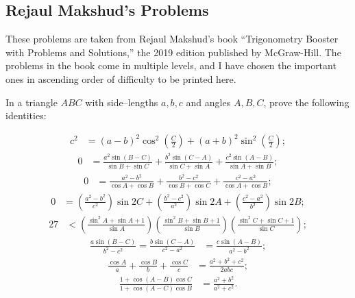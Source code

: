 \subsection{Rejaul Makshud's Problems}
These problems are taken from Rejaul Makshud's book ``Trigonometry Booster with Problems and Solutions,'' the 2019 edition published by McGraw-Hill. The problems in the book come in multiple levels, and I have chosen the important ones in ascending order of difficulty to be printed here.



\begin{question}[name=Exercises in Law of Sines and Law of Cosines]
    In a triangle $ABC$ with side--lengths $a,b,c$ and angles $A,B,C$, prove the following identities:
    \begin{tasks}
        \task \begin{align*}
         c^2 &= (a-b)^2\cos^2\left(\frac{C}{2}\right)+(a+b)^2\sin^2\left(\frac{C}{2}\right);
    \end{align*}
    \task \begin{align*}
         0 &=  \frac{a^2\sin(B-C)}{\sin B + \sin C} + \frac{b^2\sin(C-A)}{\sin C + \sin A} + \frac{c^2\sin(A-B)}{\sin A + \sin B};
    \end{align*}
    \task \begin{align*}
        0 &=  \frac{a^2-b^2}{\cos A + \cos B} + \frac{b^2-c^2}{\cos B + \cos C} + \frac{c^2-a^2}{\cos A + \cos B};
    \end{align*}
    \task \begin{align*}
        0 &=  \left(\frac{a^2-b^2}{c^2}\right)\sin 2C + \left(\frac{b^2-c^2}{a^2}\right)\sin 2A + \left(\frac{c^2-a^2}{b^2}\right)\sin 2B;
    \end{align*}
    \task \begin{align*}
        27 &< \left(\frac{\sin^2 A + \sin A + 1}{\sin A}\right)\left(\frac{\sin^2 B + \sin B + 1}{\sin B}\right)\left(\frac{\sin^2 C + \sin C + 1}{\sin C}\right);
    \end{align*}
    \task \begin{align*}
        \frac{a\sin(B-C)}{b^2-c^2} = \frac{b\sin(C-A)}{c^2-a^2} &= \frac{c\sin(A-B)}{a^2-b^2};
    \end{align*}
    \task \begin{align*}
        \frac{\cos A}{a}+\frac{\cos B}{b}+\frac{\cos C}{c} &= \frac{a^2+b^2+c^2}{2abc};
    \end{align*}
    \task \begin{align*}
        \frac{1+\cos(A-B)\cos C}{1+\cos(A-C)\cos B} &= \frac{a^2+b^2}{a^2+c^2}.

\end{align*}
\end{tasks}
\end{question}
